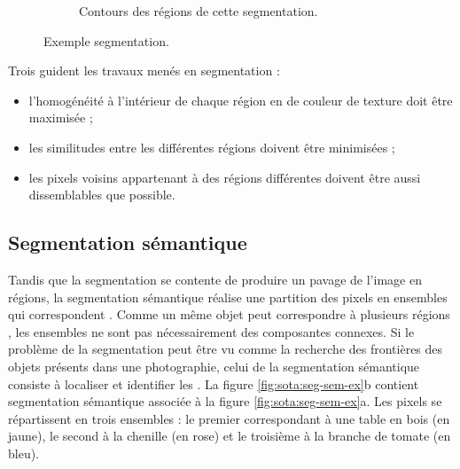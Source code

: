 \begin{figure}[htb]
\begin{subfigure}[t]{0.3\textwidth}
		 \caption{Contours des régions de cette segmentation.}
	\end{subfigure}
	\caption{Exemple  segmentation.}
	\label{fig:sota:seg-ex}
\end{figure}


Trois  guident les travaux menés en segmentation :
\begin{itemize}
\item l'homogénéité à l'intérieur de chaque région en  de couleur  de texture doit être maximisée ;
\item les similitudes entre les différentes régions doivent être minimisées ;
\item les pixels voisins appartenant à des régions différentes doivent être aussi dissemblables que possible.
\end{itemize} 



\subsection{Segmentation sémantique}

Tandis que la segmentation se contente de produire un pavage de l'image en régions, la segmentation sémantique réalise une partition des pixels en ensembles qui correspondent . Comme un même objet peut correspondre à plusieurs régions , les ensembles ne sont pas nécessairement des composantes connexes. Si le problème de la segmentation peut être vu comme la recherche des frontières des objets présents dans une photographie, celui de la segmentation sémantique consiste à  localiser et identifier les . La figure \ref{fig:sota:seg-sem-ex}b contient  segmentation sémantique associée à la figure \ref{fig:sota:seg-sem-ex}a. Les pixels se répartissent en trois ensembles : le premier correspondant à une table en bois (en jaune), le second à la chenille (en rose) et le troisième à la branche de tomate (en bleu).

